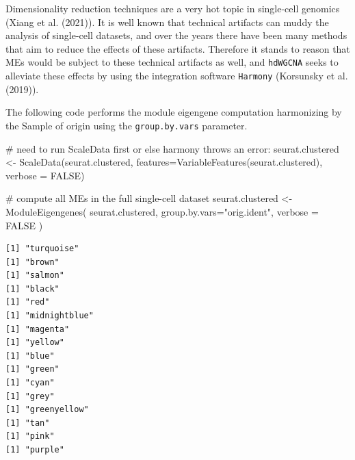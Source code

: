 \documentclass[
  letterpaper,
  DIV=11,
  numbers=noendperiod]{scrartcl}
\newenvironment{Shaded}{\begin{snugshade}}{\end{snugshade}}
\newcommand{\AttributeTok}[1]{\textcolor[rgb]{0.40,0.45,0.13}{#1}}
\newcommand{\CommentTok}[1]{\textcolor[rgb]{0.37,0.37,0.37}{#1}}
\newcommand{\ConstantTok}[1]{\textcolor[rgb]{0.56,0.35,0.01}{#1}}
\newcommand{\FunctionTok}[1]{\textcolor[rgb]{0.28,0.35,0.67}{#1}}
\newcommand{\NormalTok}[1]{\textcolor[rgb]{0.00,0.23,0.31}{#1}}
\newcommand{\OtherTok}[1]{\textcolor[rgb]{0.00,0.23,0.31}{#1}}
\newcommand{\StringTok}[1]{\textcolor[rgb]{0.13,0.47,0.30}{#1}}
\begin{document}
Dimensionality reduction techniques are a very hot topic in single-cell
genomics (Xiang et al. (2021)). It is well known that technical
artifacts can muddy the analysis of single-cell datasets, and over the
years there have been many methods that aim to reduce the effects of
these artifacts. Therefore it stands to reason that MEs would be subject
to these technical artifacts as well, and \texttt{hdWGCNA} seeks to
alleviate these effects by using the integration software
\texttt{Harmony} (Korsunsky et al. (2019)).

The following code performs the module eigengene computation harmonizing
by the Sample of origin using the \texttt{group.by.vars} parameter.

\begin{Shaded}
\begin{Highlighting}[]
\CommentTok{\# need to run ScaleData first or else harmony throws an error:}
\NormalTok{seurat.clustered }\OtherTok{\textless{}{-}} \FunctionTok{ScaleData}\NormalTok{(seurat.clustered, }
                              \AttributeTok{features=}\FunctionTok{VariableFeatures}\NormalTok{(seurat.clustered), }
                              \AttributeTok{verbose =} \ConstantTok{FALSE}\NormalTok{)}
\end{Highlighting}
\end{Shaded}

\begin{Shaded}
\begin{Highlighting}[]
\CommentTok{\# compute all MEs in the full single{-}cell dataset}
\NormalTok{seurat.clustered }\OtherTok{\textless{}{-}} \FunctionTok{ModuleEigengenes}\NormalTok{( }
\NormalTok{ seurat.clustered,}
 \AttributeTok{group.by.vars=}\StringTok{"orig.ident"}\NormalTok{,}
 \AttributeTok{verbose =} \ConstantTok{FALSE}
\NormalTok{)}
\end{Highlighting}
\end{Shaded}

\begin{verbatim}
[1] "turquoise"
[1] "brown"
[1] "salmon"
[1] "black"
[1] "red"
[1] "midnightblue"
[1] "magenta"
[1] "yellow"
[1] "blue"
[1] "green"
[1] "cyan"
[1] "grey"
[1] "greenyellow"
[1] "tan"
[1] "pink"
[1] "purple"
\end{verbatim}
\end{document}
